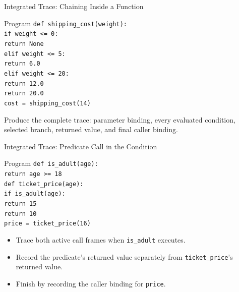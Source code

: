 \documentclass[aspectratio=169,10pt]{beamer}
\begin{document}

\begin{frame}{Integrated Trace: Chaining Inside a Function}
  \begin{block}{Program}
    \texttt{def shipping\_cost(weight):}\\
    \hspace*{0.20in}\texttt{if weight <= 0:}\\
    \hspace*{0.40in}\texttt{return None}\\
    \hspace*{0.20in}\texttt{elif weight <= 5:}\\
    \hspace*{0.40in}\texttt{return 6.0}\\
    \hspace*{0.20in}\texttt{elif weight <= 20:}\\
    \hspace*{0.40in}\texttt{return 12.0}\\
    \hspace*{0.20in}\texttt{return 20.0}\\[0.08in]
    \texttt{cost = shipping\_cost(14)}
  \end{block}

  \begin{activity}
    Produce the complete trace: parameter binding, every evaluated condition, selected branch, returned value, and final caller binding.
  \end{activity}
\end{frame}

\begin{frame}{Integrated Trace: Predicate Call in the Condition}
  \begin{block}{Program}
    \texttt{def is\_adult(age):}\\
    \hspace*{0.20in}\texttt{return age >= 18}\\[0.06in]
    \texttt{def ticket\_price(age):}\\
    \hspace*{0.20in}\texttt{if is\_adult(age):}\\
    \hspace*{0.40in}\texttt{return 15}\\
    \hspace*{0.20in}\texttt{return 10}\\[0.06in]
    \texttt{price = ticket\_price(16)}
  \end{block}

  \begin{itemize}
    \item Trace both active call frames when \texttt{is\_adult} executes.
    \item Record the predicate's returned value separately from \texttt{ticket\_price}'s returned value.
    \item Finish by recording the caller binding for \texttt{price}.
  \end{itemize}
\end{frame}
\end{document}
